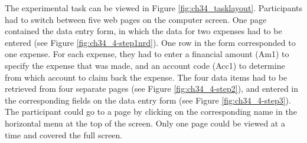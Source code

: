 The experimental task can be viewed in Figure \ref{fig:ch34_tasklayout}. Participants had to switch between five web pages on the computer screen. One page contained the data entry form, in which the data for two expenses had to be entered (see Figure \ref{fig:ch34_4-step1nrd}). One row in the form corresponded to one expense. For each expense, they had to enter a financial amount (Am1) to specify the expense that was made, and an account code (Acc1) to determine from which account to claim back the expense. 
The four data items had to be retrieved from four separate pages (see Figure \ref{fig:ch34_4-step2}), and entered in the corresponding fields on the data entry form (see Figure \ref{fig:ch34_4-step3}). The participant could go to a page by clicking on the corresponding name in the horizontal menu at the top of the screen. Only one page could be viewed at a time and covered the full screen. 

